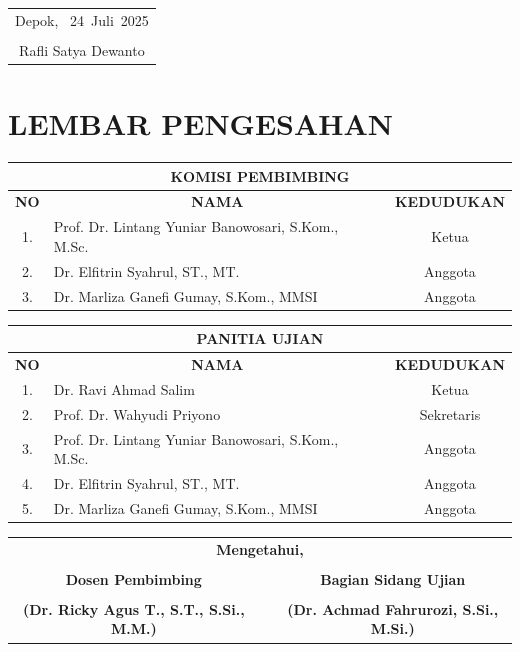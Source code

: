 \documentclass[12pt,oneside,bahasa]{book}
\providecommand{\tabularnewline}{\\}
\newcommand{\Penulis}{Rafli Satya Dewanto}
\newcommand{\Tahun}{2025}
\newcommand{\Bulan}{Juli}
\newcommand{\Tanggal}{24}
\newcommand{\KoordinatorPI}{Dr. Achmad Fahrurozi, S.Si., M.Si.}
\newcommand{\DosenPembimbingB}{Dr. Ricky Agus T., S.T., S.Si., M.M.}
\newcommand{\KetuaPembimbing}{Prof. Dr. Lintang Yuniar Banowosari, S.Kom., M.Sc.}
\newcommand{\AnggotaPembimbingA}{Dr. Elfitrin Syahrul, ST., MT.}
\newcommand{\AnggotaPembimbingB}{Dr. Marliza Ganefi Gumay, S.Kom., MMSI}
\newcommand{\KetuaUjian}{Dr. Ravi Ahmad Salim}
\newcommand{\SekUjian}{Prof. Dr. Wahyudi Priyono}
\newcommand{\AnggotaUjianA}{Prof. Dr. Lintang Yuniar Banowosari, S.Kom., M.Sc.}
\newcommand{\AnggotaUjianB}{Dr. Elfitrin Syahrul, ST., MT.}
\newcommand{\AnggotaUjianC}{Dr. Marliza Ganefi Gumay, S.Kom., MMSI}
\newcommand{\KotaPenulis}{Depok}
\begin{document}
\begin{flushright}
\begin{tabular}{c}
\KotaPenulis, \  \Tanggal\ \Bulan\ \Tahun\tabularnewline
\vspace*{25mm}\tabularnewline
\Penulis\tabularnewline
\end{tabular}
\par\end{flushright}

\chapter*{{\huge LEMBAR PENGESAHAN}}


\begin{center}
\begin{tabular}{|c|ll|c|}
\multicolumn{4}{c}{\textbf{KOMISI PEMBIMBING}}\tabularnewline
\hline 
\textbf{NO} & \multicolumn{2}{c|}{\textbf{NAMA}} & \textbf{KEDUDUKAN}\tabularnewline
\hline 
1. & \KetuaPembimbing &  & Ketua\tabularnewline
\hline 
2. & \AnggotaPembimbingA &  & Anggota\tabularnewline
\hline 
3. & \AnggotaPembimbingB &  & Anggota\tabularnewline
\hline 
\end{tabular}
\par\end{center}

\begin{center}
\begin{tabular}{|c|ll|c|}
\multicolumn{4}{c}{\textbf{PANITIA UJIAN}}\tabularnewline
\hline 
\textbf{NO} & \multicolumn{2}{c|}{\textbf{NAMA}} & \textbf{KEDUDUKAN}\tabularnewline
\hline 
1. & \KetuaUjian &  & Ketua\tabularnewline
\hline 
2. & \SekUjian &  & Sekretaris\tabularnewline
\hline 
3. & \AnggotaUjianA &  & Anggota\tabularnewline
\hline 
4. & \AnggotaUjianB &  & Anggota\tabularnewline
\hline 
5. & \AnggotaUjianC &  & Anggota\tabularnewline
\hline 
\end{tabular}
\par\end{center}

\begin{center}
\vspace*{5mm}
\par\end{center}

\begin{center}
\begin{tabular}{ccc}
\multicolumn{3}{c}{\textbf{Mengetahui,}}\tabularnewline
\multicolumn{3}{c}{\textbf{\vspace*{5mm}}}\tabularnewline
\textbf{Dosen Pembimbing} &  & \textbf{Bagian Sidang Ujian}\tabularnewline
\textbf{\vspace*{10mm}} &  & \textbf{\vspace*{10mm}}\tabularnewline
\textbf{(\DosenPembimbingB)} &  & \textbf{(\KoordinatorPI)}\tabularnewline
\end{tabular}
\par\end{center}
\end{document}
